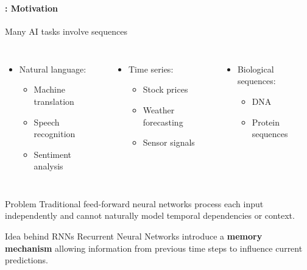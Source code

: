 \documentclass[xcolor=table]{beamer}
\subtitle[RNNs]{Recurrent Neural Networks}
\begin{document}
\begin{frame}
	\frametitle{\inserttitle}
	\framesubtitle{\insertshortsubtitle: Motivation}
	
	\begin{exampleblock}{Many AI tasks involve sequences}
		\small\vskip-8pt
		\begin{columns}
			\begin{itemize}
				\item Natural language:
				\begin{itemize}\footnotesize
					\item Machine translation
					\item Speech recognition
					\item Sentiment analysis
				\end{itemize}
			\end{itemize}
			
			\begin{itemize}
				\item Time series:
				\begin{itemize}\footnotesize
					\item Stock prices
					\item Weather forecasting
					\item Sensor signals
				\end{itemize}
			\end{itemize}
			
			\begin{itemize}
				\item Biological sequences:
				\begin{itemize}\footnotesize
					\item DNA
					\item Protein sequences
				\end{itemize}
			\end{itemize}
		\end{columns}
	\end{exampleblock}
	
	\vskip-6pt
	
	\begin{alertblock}{Problem}
		Traditional feed-forward neural networks process each input independently and cannot naturally model temporal dependencies or context.
	\end{alertblock}
	
	\vskip-6pt
	
	\begin{block}{Idea behind RNNs}
		Recurrent Neural Networks introduce a \textbf{memory mechanism} allowing information from previous time steps to influence current predictions.
	\end{block}
	
\end{frame}
\end{document}
